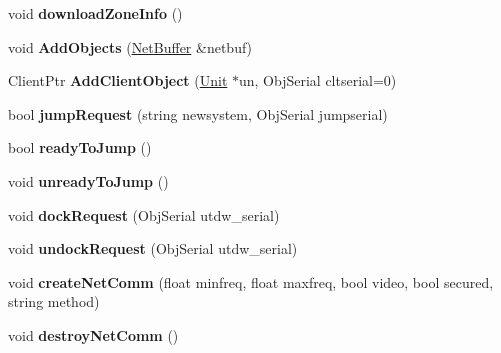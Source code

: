 \begin{DoxyCompactItemize}
\item 
void {\bfseries download\+Zone\+Info} ()\hypertarget{classNetClient_a7e60a8b47d48f1e9ee21c0a3ab12c33c}{}\label{classNetClient_a7e60a8b47d48f1e9ee21c0a3ab12c33c}

\item 
void {\bfseries Add\+Objects} (\hyperlink{classNetBuffer}{Net\+Buffer} \&netbuf)\hypertarget{classNetClient_a03c51cc353d00be9485ed84142db1e2a}{}\label{classNetClient_a03c51cc353d00be9485ed84142db1e2a}

\item 
Client\+Ptr {\bfseries Add\+Client\+Object} (\hyperlink{classUnit}{Unit} $\ast$un, Obj\+Serial cltserial=0)\hypertarget{classNetClient_a73e259036177fd24ef8aeea4c50d7eae}{}\label{classNetClient_a73e259036177fd24ef8aeea4c50d7eae}

\item 
bool {\bfseries jump\+Request} (string newsystem, Obj\+Serial jumpserial)\hypertarget{classNetClient_a816fb1b008c82af0c8ee39325526cced}{}\label{classNetClient_a816fb1b008c82af0c8ee39325526cced}

\item 
bool {\bfseries ready\+To\+Jump} ()\hypertarget{classNetClient_a67360d92b8f33f23cb3dac393a75e857}{}\label{classNetClient_a67360d92b8f33f23cb3dac393a75e857}

\item 
void {\bfseries unready\+To\+Jump} ()\hypertarget{classNetClient_af98b69f25bb4097dd136f1568bd415d0}{}\label{classNetClient_af98b69f25bb4097dd136f1568bd415d0}

\item 
void {\bfseries dock\+Request} (Obj\+Serial utdw\+\_\+serial)\hypertarget{classNetClient_a26f5e2ea32bf6c4ffe1fb82538009ad4}{}\label{classNetClient_a26f5e2ea32bf6c4ffe1fb82538009ad4}

\item 
void {\bfseries undock\+Request} (Obj\+Serial utdw\+\_\+serial)\hypertarget{classNetClient_af8ea7895763b7a1cc6d5e2a26f15df1b}{}\label{classNetClient_af8ea7895763b7a1cc6d5e2a26f15df1b}

\item 
void {\bfseries create\+Net\+Comm} (float minfreq, float maxfreq, bool video, bool secured, string method)\hypertarget{classNetClient_a1b64aa304bd7276dcb1f18badd2f2338}{}\label{classNetClient_a1b64aa304bd7276dcb1f18badd2f2338}

\item 
void {\bfseries destroy\+Net\+Comm} ()\hypertarget{classNetClient_adc5e8d33b90ab1f708396735fa6dfe9b}{}\label{classNetClient_adc5e8d33b90ab1f708396735fa6dfe9b}


\end{DoxyCompactItemize}
